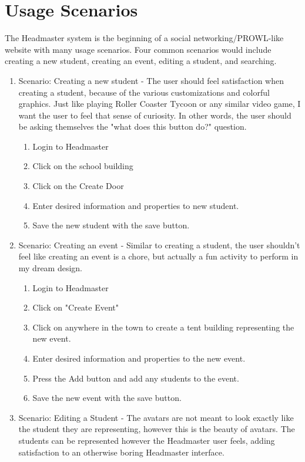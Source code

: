 \documentclass[11pt]{article}
\begin{document}
\section{Usage Scenarios}
The Headmaster system is the beginning of a social networking/PROWL-like website with many usage scenarios. Four common scenarios would include creating a new student, creating an event, editing a student, and searching.
\begin{enumerate}
    \item Scenario: Creating a new student - The user should feel satisfaction when creating a student, because of the various customizations and colorful graphics. Just like playing Roller Coaster Tycoon or any similar video game, I want the user to feel that sense of curiosity. In other words, the user should be asking themselves the "what does this button do?" question.
  \begin{enumerate}
        \item Login to Headmaster
        \item Click on the school building
        \item Click on the Create Door
        \item Enter desired information and properties to new student.
        \item Save the new student with the save button.
  \end{enumerate}
    \item Scenario: Creating an event - Similar to creating a student, the user shouldn't feel like creating an event is a chore, but actually a fun activity to perform in my dream design.
  \begin{enumerate}
        \item Login to Headmaster
        \item Click on "Create Event"
        \item Click on anywhere in the town to create a tent building representing the new event.
        \item Enter desired information and properties to the new event.
        \item Press the Add button and add any students to the event.
        \item Save the new event with the save button.
  \end{enumerate}
    \item Scenario: Editing a Student - The avatars are not meant to look exactly like the student they are representing, however this is the beauty of avatars. The students can be represented however the Headmaster user feels, adding satisfaction to an otherwise boring Headmaster interface.

\end{enumerate}
\end{document}
